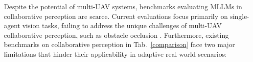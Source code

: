 \documentclass[letterpaper]{article} %
\begin{document}
Despite the potential of multi-UAV systems, benchmarks evaluating MLLMs in collaborative perception are scarce. Current evaluations focus primarily on single-agent vision tasks, failing to address the unique challenges of multi-UAV collaborative perception, such as obstacle occlusion \cite{kil2024mllm, xiao2025uav, guo2025bedi, chen2025large}.
Furthermore, existing benchmarks on collaborative perception \cite{wang2024drones, tian2024ucdnet, liu2020when2com} in Tab.~\ref{comparison} face two major limitations that hinder their applicability in adaptive real-world scenarios:
%
%
%
%
\end{document}
